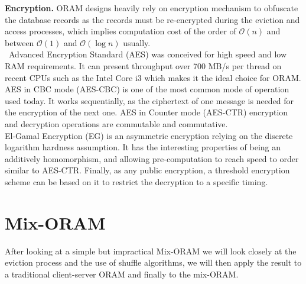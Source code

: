 \documentclass{llncs}
\begin{document}
\noindent\textbf{Encryption.}
ORAM designs heavily rely on encryption mechanism to obfuscate the database records as the records must be re-encrypted during the eviction and access processes, which implies computation cost of the order of $\mathcal{O} \left ( n \right )$ and between $\mathcal{O} \left ( 1 \right )$ and $\mathcal{O} \left ( \log n \right )$ usually.\\\
Advanced Encryption Standard (AES) was conceived for high speed and low RAM requirements. It can present throughput over 700 MB/s per thread on recent CPUs such as the Intel Core i3 which makes it the ideal choice for ORAM.\\
AES in CBC mode (AES-CBC) is one of the most common mode of operation used today. It works sequentially, as the ciphertext of one message is needed for the encryption of the next one. 
AES in Counter mode (AES-CTR) encryption and decryption operations are commutable and commutative.\\
El-Gamal Encryption (EG) is an asymmetric encryption relying on the discrete logarithm hardness assumption. It has the interesting properties of being an additively homomorphism, and allowing pre-computation to reach speed to order similar to AES-CTR. Finally, as any public encryption, a threshold encryption scheme can be based on it to restrict the decryption to a specific timing.
%
\section{Mix-ORAM}\label{Mix-ORAM}
After looking at a simple but impractical Mix-ORAM we will look closely at the eviction process and the use of shuffle algorithms, we will then apply the result to a traditional client-server ORAM and finally to the mix-ORAM.
%
\end{document}
